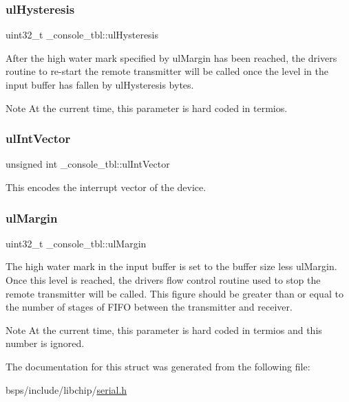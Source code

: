 \subsubsection{\texorpdfstring{ulHysteresis}{ulHysteresis}}
{\footnotesize\ttfamily uint32\+\_\+t \+\_\+console\+\_\+tbl\+::ul\+Hysteresis}

After the high water mark specified by ul\+Margin has been reached, the driver\textquotesingle{}s routine to re-\/start the remote transmitter will be called once the level in the input buffer has fallen by ul\+Hysteresis bytes.

\begin{DoxyNote}{Note}
At the current time, this parameter is hard coded in termios. 
\end{DoxyNote}
\mbox{\label{struct__console__tbl_a3b5873934764edfdd97588457344dded}} 
\subsubsection{\texorpdfstring{ulIntVector}{ulIntVector}}
{\footnotesize\ttfamily unsigned int \+\_\+console\+\_\+tbl\+::ul\+Int\+Vector}

This encodes the interrupt vector of the device. \mbox{\label{struct__console__tbl_a59327992956e06804d26eab199477706}} 
\subsubsection{\texorpdfstring{ulMargin}{ulMargin}}
{\footnotesize\ttfamily uint32\+\_\+t \+\_\+console\+\_\+tbl\+::ul\+Margin}

The high water mark in the input buffer is set to the buffer size less ul\+Margin. Once this level is reached, the driver\textquotesingle{}s flow control routine used to stop the remote transmitter will be called. This figure should be greater than or equal to the number of stages of F\+I\+FO between the transmitter and receiver.

\begin{DoxyNote}{Note}
At the current time, this parameter is hard coded in termios and this number is ignored. 
\end{DoxyNote}


The documentation for this struct was generated from the following file\+:\begin{DoxyCompactItemize}
\item 
bsps/include/libchip/\mbox{\hyperlink{serial_8h}{serial.\+h}}\end{DoxyCompactItemize}
